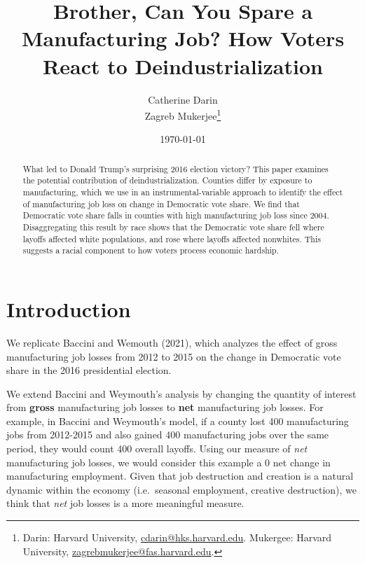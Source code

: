 \documentclass[]{AEA}
\begin{document}
\title{Brother, Can You Spare a Manufacturing Job? How Voters React to
Deindustrialization}



\author{
  Catherine Darin\\
  Zagreb Mukerjee\thanks{
  Darin: Harvard University, \href{mailto:cdarin@hks.harvard.edu}{cdarin@hks.harvard.edu}.
  Mukergee: Harvard University, \href{mailto:zagrebmukerjee@fas.harvard.edu}{zagrebmukerjee@fas.harvard.edu}.
}
}

\date{\today}
\JEL{, }
\Keywords{, }

\begin{abstract}
What led to Donald Trump's surprising 2016 election victory? This paper
examines the potential contribution of deindustrialization. Counties
differ by exposure to manufacturing, which we use in an
instrumental-variable approach to identify the effect of manufacturing
job loss on change in Democratic vote share. We find that Democratic
vote share falls in counties with high manufacturing job loss since
2004. Disaggregating this result by race shows that the Democratic vote
share fell where layoffs affected white populations, and rose where
layoffs affected nonwhites. This suggests a racial component to how
voters process economic hardship.
\end{abstract}


\maketitle

\section{Introduction}

We replicate Baccini and Wemouth (2021), which analyzes the effect of
gross manufacturing job losses from 2012 to 2015 on the change in
Democratic vote share in the 2016 presidential election.

We extend Baccini and Weymouth's analysis by changing the quantity of
interest from \textbf{gross} manufacturing job losses to \textbf{net}
manufacturing job losses. For example, in Baccini and Weymouth's model,
if a county lost 400 manufacturing jobs from 2012-2015 and also gained
400 manufacturing jobs over the same period, they would count 400
overall layoffs. Using our measure of \emph{net} manufacturing job
losses, we would consider this example a 0 net change in manufacturing
employment. Given that job destruction and creation is a natural dynamic
within the economy (i.e.~seasonal employment, creative destruction), we
think that \emph{net} job losses is a more meaningful measure.
\end{document}
